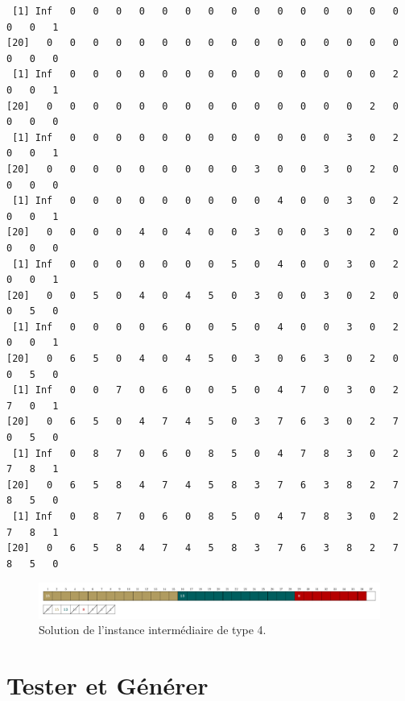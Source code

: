 \documentclass[11pt]{article}
\begin{document}
\begin{verbatim}
 [1] Inf   0   0   0   0   0   0   0   0   0   0   0   0   0   0   0   0   0   1
[20]   0   0   0   0   0   0   0   0   0   0   0   0   0   0   0   0   0   0   0
 [1] Inf   0   0   0   0   0   0   0   0   0   0   0   0   0   0   2   0   0   1
[20]   0   0   0   0   0   0   0   0   0   0   0   0   0   0   2   0   0   0   0
 [1] Inf   0   0   0   0   0   0   0   0   0   0   0   0   3   0   2   0   0   1
[20]   0   0   0   0   0   0   0   0   0   3   0   0   3   0   2   0   0   0   0
 [1] Inf   0   0   0   0   0   0   0   0   0   4   0   0   3   0   2   0   0   1
[20]   0   0   0   0   4   0   4   0   0   3   0   0   3   0   2   0   0   0   0
 [1] Inf   0   0   0   0   0   0   0   5   0   4   0   0   3   0   2   0   0   1
[20]   0   0   5   0   4   0   4   5   0   3   0   0   3   0   2   0   0   5   0
 [1] Inf   0   0   0   0   6   0   0   5   0   4   0   0   3   0   2   0   0   1
[20]   0   6   5   0   4   0   4   5   0   3   0   6   3   0   2   0   0   5   0
 [1] Inf   0   0   7   0   6   0   0   5   0   4   7   0   3   0   2   7   0   1
[20]   0   6   5   0   4   7   4   5   0   3   7   6   3   0   2   7   0   5   0
 [1] Inf   0   8   7   0   6   0   8   5   0   4   7   8   3   0   2   7   8   1
[20]   0   6   5   8   4   7   4   5   8   3   7   6   3   8   2   7   8   5   0
 [1] Inf   0   8   7   0   6   0   8   5   0   4   7   8   3   0   2   7   8   1
[20]   0   6   5   8   4   7   4   5   8   3   7   6   3   8   2   7   8   5   0
\end{verbatim}
  \begin{figure}[htbp]
    \centering
    \includegraphics[width=0.6\linewidth]{ex4-8-DP.pdf}
    \caption{Solution de l'instance intermédiaire de type 4.}
  \end{figure}



  \section{Tester et Générer}
\end{document}
